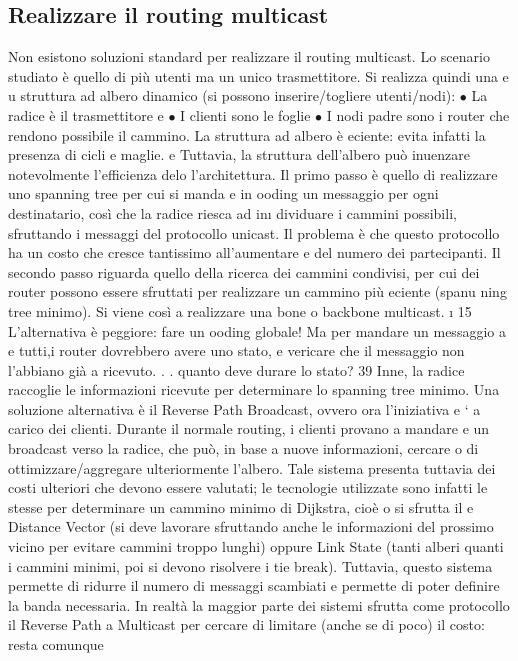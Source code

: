 \documentclass[a4paper,12pt]{article}
\begin{document}
\subsection{Realizzare il routing multicast}
Non esistono soluzioni standard per realizzare il routing multicast. Lo scenario
studiato è quello di più utenti ma un unico trasmettitore. Si realizza quindi una
e
u
struttura ad albero dinamico (si possono inserire/togliere utenti/nodi):
$\bullet$ La radice è il trasmettitore
e
$\bullet$ I clienti sono le foglie
$\bullet$ I nodi padre sono i router che rendono possibile il cammino.
La struttura ad albero è eciente: evita infatti la presenza di cicli e maglie.
e
Tuttavia, la struttura dell'albero può inuenzare notevolmente l'efficienza delo
l'architettura.
Il primo passo è quello di realizzare uno spanning tree per cui si manda
e
in ooding un messaggio per ogni destinatario, così che la radice riesca ad in\i{}
dividuare i cammini possibili, sfruttando i messaggi del protocollo unicast. Il
problema è che questo protocollo ha un costo che cresce tantissimo all'aumentare
e
del numero dei partecipanti.
Il secondo passo riguarda quello della ricerca dei cammini condivisi, per cui
dei router possono essere sfruttati per realizzare un cammino più eciente (spanu
ning tree minimo). Si viene così a realizzare una bone o backbone multicast.
\i{}
15 L'alternativa è peggiore: fare un ooding globale! Ma per mandare un messaggio a
e
tutti,i router dovrebbero avere uno stato, e vericare che il messaggio non l'abbiano già
a
ricevuto. . . quanto deve durare lo stato?
39
Inne, la radice raccoglie le informazioni ricevute per determinare lo spanning
tree minimo.
Una soluzione alternativa è il Reverse Path Broadcast, ovvero ora l'iniziativa
e
` a carico dei clienti. Durante il normale routing, i clienti provano a mandare
e
un broadcast verso la radice, che può, in base a nuove informazioni, cercare
o
di ottimizzare/aggregare ulteriormente l'albero. Tale sistema presenta tuttavia
dei costi ulteriori che devono essere valutati; le tecnologie utilizzate sono infatti
le stesse per determinare un cammino minimo di Dijkstra, cioè o si sfrutta il
e
Distance Vector (si deve lavorare sfruttando anche le informazioni del prossimo
vicino per evitare cammini troppo lunghi) oppure Link State (tanti alberi quanti
i cammini minimi, poi si devono risolvere i tie break). Tuttavia, questo sistema
permette di ridurre il numero di messaggi scambiati e permette di poter definire
la banda necessaria.
In realtà la maggior parte dei sistemi sfrutta come protocollo il Reverse Path
a
Multicast per cercare di limitare (anche se di poco) il costo: resta comunque
\end{document}
